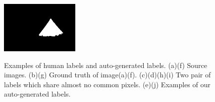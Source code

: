 \documentclass[runningheads,a4paper]{llncs}
\begin{document}
\begin{figure}[!tb]
{\includegraphics[width=0.15\columnwidth,height=1in]{images/188063-gt.png}
}

\caption{Examples of human labels and auto-generated labels. (a)(f) Source images. (b)(g) Ground truth of image(a)(f). (c)(d)(h)(i) Two pair of labels which share almost no common pixels. (e)(j) Examples of our auto-generated labels.}
\label{fig:example}
\end{figure}
\end{document}
